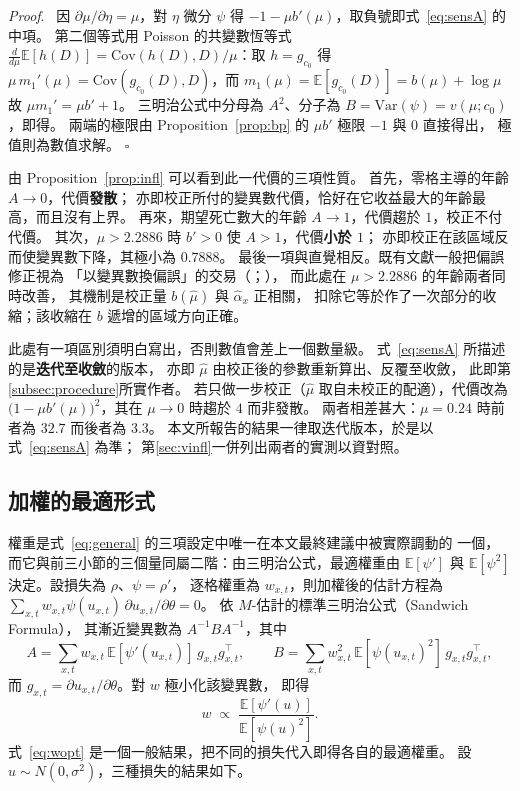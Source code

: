 \documentclass[UTF8, fontset=macnew, a4paper, 12pt]{ctexart}
\newenvironment{proof}{\par\noindent\textit{Proof}.\ }{\hfill$\square$\par\vspace{4pt}}
\newcommand{\Ex}{\mathbb{E}}
\begin{document}
\begin{proof}
因 $\partial\mu/\partial\eta=\mu$，對 $\eta$ 微分 $\psi$ 得
$-1-\mu b'(\mu)$，取負號即式~\eqref{eq:sensA} 的中項。
第二個等式用 Poisson 的共變數恆等式
$\frac{d}{d\mu}\Ex[h(D)]=\mathrm{Cov}(h(D),D)/\mu$：取 $h=g_{c_0}$ 得
$\mu\,m_1'(\mu)=\mathrm{Cov}(g_{c_0}(D),D)$，而 $m_1(\mu)=\Ex[g_{c_0}(D)]
=b(\mu)+\log\mu$ 故 $\mu m_1'=\mu b'+1$。
三明治公式中分母為 $A^2$、分子為 $B=\mathrm{Var}(\psi)=v(\mu;c_0)$，即得。
兩端的極限由 Proposition~\ref{prop:bp} 的 $\mu b'$ 極限 $-1$ 與 $0$ 直接得出，
極值則為數值求解。
\end{proof}

由 Proposition~\ref{prop:infl} 可以看到此一代價的三項性質。
首先，零格主導的年齡 $A\to0$，代價\textbf{發散}；
亦即校正所付的變異數代價，恰好在它收益最大的年齡最高，而且沒有上界。
再來，期望死亡數大的年齡 $A\to1$，代價趨於 $1$，校正不付代價。
其次，$\mu>2.2886$ 時 $b'>0$ 使 $A>1$，代價\textbf{小於 $1$}；
亦即校正在該區域反而使變異數下降，其極小為 $0.7888$。
最後一項與直覺相反。既有文獻一般把偏誤修正視為
「以變異數換偏誤」的交易（\citealp{firth1993}；\citealp{huber2009}），
而此處在 $\mu>2.2886$ 的年齡兩者同時改善，
其機制是校正量 $b(\hat\mu)$ 與 $\hat\alpha_x$ 正相關，
扣除它等於作了一次部分的收縮；該收縮在 $b$ 遞增的區域方向正確。

此處有一項區別須明白寫出，否則數值會差上一個數量級。
式~\eqref{eq:sensA} 所描述的是\textbf{迭代至收斂}的版本，
亦即 $\hat\mu$ 由校正後的參數重新算出、反覆至收斂，
此即第\ref{subsec:procedure}所實作者。
若只做一步校正（$\hat\mu$ 取自未校正的配適），代價改為
$\bigl(1-\mu b'(\mu)\bigr)^2$，其在 $\mu\to0$ 時趨於 $4$ 而非發散。
兩者相差甚大：$\mu=0.24$ 時前者為 $32.7$ 而後者為 $3.3$。
本文所報告的結果一律取迭代版本，於是以式~\eqref{eq:sensA} 為準；
第\ref{sec:vinfl}一併列出兩者的實測以資對照。

\subsection{加權的最適形式}\label{sec:weight}

權重是式~\eqref{eq:general} 的三項設定中唯一在本文最終建議中被實際調動的
一個，而它與前三小節的三個量同屬二階：由三明治公式，最適權重由
$\Ex[\psi']$ 與 $\Ex[\psi^2]$ 決定。設損失為 $\rho$、$\psi=\rho'$，
逐格權重為 $w_{x,t}$，則加權後的估計方程為
$\sum_{x,t}w_{x,t}\psi(u_{x,t})\,\partial u_{x,t}/\partial\theta=0$。
依 $M$-估計的標準三明治公式（Sandwich Formula），
其漸近變異數為 $A^{-1}BA^{-1}$，其中
\[
A=\sum_{x,t} w_{x,t}\,\Ex[\psi'(u_{x,t})]\,g_{x,t}g_{x,t}^{\top},\qquad
B=\sum_{x,t} w_{x,t}^{2}\,\Ex[\psi(u_{x,t})^{2}]\,g_{x,t}g_{x,t}^{\top},
\]
而 $g_{x,t}=\partial u_{x,t}/\partial\theta$。對 $w$ 極小化該變異數，
即得
\begin{equation}\label{eq:wopt}
w\;\propto\;\frac{\Ex[\psi'(u)]}{\Ex[\psi(u)^{2}]} .
\end{equation}
式~\eqref{eq:wopt} 是一個一般結果，把不同的損失代入即得各自的最適權重。
設 $u\sim N(0,\sigma^2)$，三種損失的結果如下。
\end{document}
